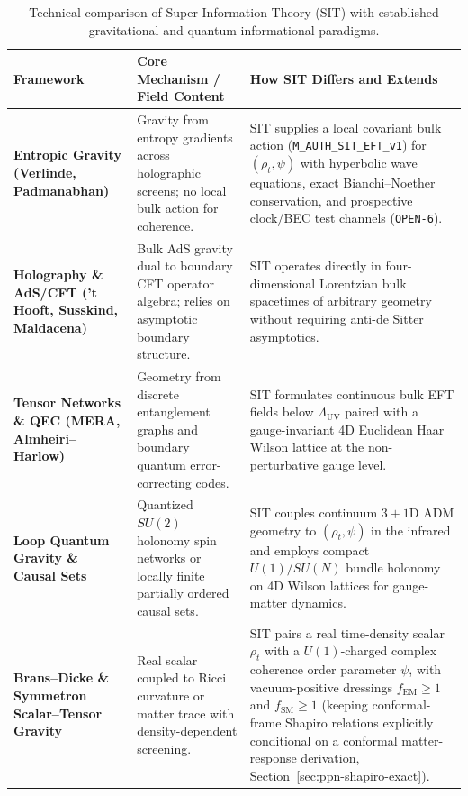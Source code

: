 \begin{table}[htbp]
\centering
\caption{Technical comparison of Super Information Theory (SIT) with established gravitational and quantum-informational paradigms.}
\label{tab:sit-framework-comparison}
\vspace{0.4em}
\small
\begin{tabular}{|p{3.2cm}|p{4.8cm}|p{6.8cm}|}
\hline
\textbf{Framework} & \textbf{Core Mechanism / Field Content} & \textbf{How SIT Differs and Extends} \\
\hline
\textbf{Entropic Gravity (Verlinde, Padmanabhan)} & Gravity from entropy gradients across holographic screens; no local bulk action for coherence. & SIT supplies a local covariant bulk action (\texttt{M\_AUTH\_SIT\_EFT\_v1}) for $(\rho_t, \psi)$ with hyperbolic wave equations, exact Bianchi--Noether conservation, and prospective clock/BEC test channels (\texttt{OPEN-6}). \\
\hline
\textbf{Holography \& AdS/CFT ('t Hooft, Susskind, Maldacena)} & Bulk AdS gravity dual to boundary CFT operator algebra; relies on asymptotic boundary structure. & SIT operates directly in four-dimensional Lorentzian bulk spacetimes of arbitrary geometry without requiring anti-de Sitter asymptotics. \\
\hline
\textbf{Tensor Networks \& QEC (MERA, Almheiri--Harlow)} & Geometry from discrete entanglement graphs and boundary quantum error-correcting codes. & SIT formulates continuous bulk EFT fields below $\Lambda_{\mathrm{UV}}$ paired with a gauge-invariant 4D Euclidean Haar Wilson lattice at the non-perturbative gauge level. \\
\hline
\textbf{Loop Quantum Gravity \& Causal Sets} & Quantized $SU(2)$ holonomy spin networks or locally finite partially ordered causal sets. & SIT couples continuum $3+1$D ADM geometry to $(\rho_t, \psi)$ in the infrared and employs compact $U(1)/SU(N)$ bundle holonomy on 4D Wilson lattices for gauge-matter dynamics. \\
\hline
\textbf{Brans--Dicke \& Symmetron Scalar--Tensor Gravity} & Real scalar coupled to Ricci curvature or matter trace with density-dependent screening. & SIT pairs a real time-density scalar $\rho_t$ with a $U(1)$-charged complex coherence order parameter $\psi$, with vacuum-positive dressings $f_{\mathrm{EM}} \ge 1$ and $f_{\mathrm{SM}} \ge 1$ (keeping conformal-frame Shapiro relations explicitly conditional on a conformal matter-response derivation, Section~\ref{sec:ppn-shapiro-exact}). \\
\hline
\end{tabular}
\end{table}

